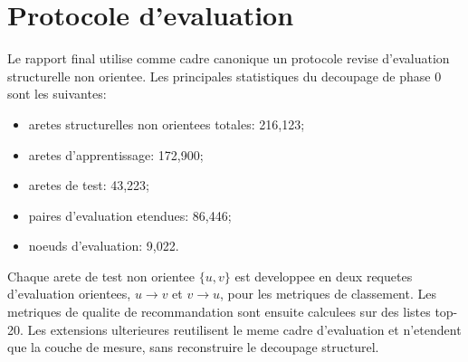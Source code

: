 \section{Protocole d'evaluation}

Le rapport final utilise comme cadre canonique un protocole revise
d'evaluation structurelle non orientee. Les principales statistiques du
decoupage de phase 0 sont les suivantes:
\begin{itemize}
    \item aretes structurelles non orientees totales: 216,123;
    \item aretes d'apprentissage: 172,900;
    \item aretes de test: 43,223;
    \item paires d'evaluation etendues: 86,446;
    \item noeuds d'evaluation: 9,022.
\end{itemize}

Chaque arete de test non orientee $\{u,v\}$ est developpee en deux requetes
d'evaluation orientees, $u \rightarrow v$ et $v \rightarrow u$, pour les
metriques de classement. Les metriques de qualite de recommandation sont
ensuite calculees sur des listes top-20. Les extensions ulterieures reutilisent le meme cadre d'evaluation et n'etendent que la
couche de mesure, sans reconstruire le decoupage structurel.
